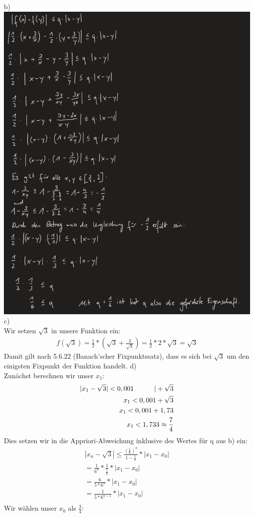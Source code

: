 \documentclass{article}
\begin{document}
\newpage
\noindent b) \\
\includegraphics[scale=0.5]{h2_2b} \\ 
\bigskip
\noindent c) \\ 
Wir setzen $\sqrt{3}$ in unsere Funktion ein: 
\begin{align*}
    f(\sqrt{3}) = \frac{1}{2} * (\sqrt{3} + \frac{3}{\sqrt{3}}) 
                = \frac{1}{2} * 2 * \sqrt{3} 
                = \sqrt{3}
\end{align*}
Damit gilt nach 5.6.22 (Banach'scher Fixpunktssatz), dass es sich bei $\sqrt{3}$ 
um den einigsten Fixpunkt der Funktion handelt.
\newpage
\noindent d) \\ 
Zunächst berechnen wir unser $x_1$: 
\begin{align*}
    | x_1 - \sqrt{3} | < 0,001  \indent \indent | + \sqrt{3} \\ 
    x_1 < 0,001 + \sqrt{3} \\ 
    x_1 < 0,001 + 1,73 \\ 
    x_1 < 1,733 \approx \frac{7}{4} \\ 
\end{align*}
Dies setzen wir in die Appriori-Abweichung inklusive des Wertes für q aus b) ein: 
\begin{align*}
    | x_n - \sqrt{3}| \leq \frac{(\frac{1}{6})^n}{1 - \frac{1}{6}} * |x_1 - x_0| \\ 
                       = \frac{1}{6^n} * \frac{1}{\frac{5}{6}} * |x_1 - x_0| \\
                       = \frac{6}{5 * 6 ^ n} * |x_1 - x_0| \\
                       = \frac{1}{5 * 6 ^ {n - 1}} * |x_1 - x_0| \\
\end{align*}
Wir wählen unser $x_0$ als $\frac{3}{4}$:
\end{document}
